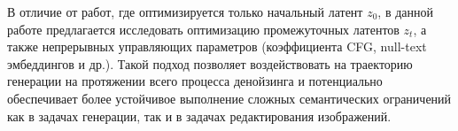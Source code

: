 В отличие от работ, где оптимизируется только начальный латент $z_0$, в данной работе предлагается исследовать оптимизацию промежуточных латентов $z_t$, а также непрерывных управляющих параметров (коэффициента CFG, null-text эмбеддингов и др.). Такой подход позволяет воздействовать на траекторию генерации на протяжении всего процесса денойзинга и потенциально обеспечивает более устойчивое выполнение сложных семантических ограничений как в задачах генерации, так и в задачах редактирования изображений.
